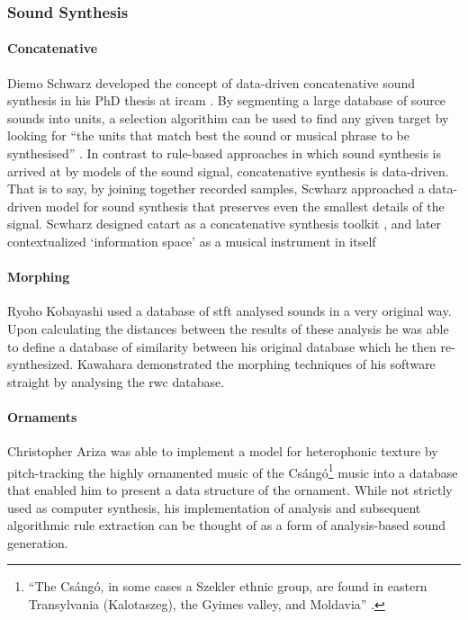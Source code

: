 \subsubsection{Sound Synthesis}
\label{applications:synthesis}

\paragraph{Concatenative}
Diemo Schwarz developed the concept of data-driven concatenative sound synthesis in his PhD thesis at \gls{ircam} \parencite{Schwarz2000, icmc/bbp2372.2003.099, Sch06:How}. By segmenting a large database of source sounds into units, a selection algorithim can be used to find any given target by looking for ``the units that match best the sound or musical phrase to be synthesised'' \parencite{Sch06:How}. In contrast to rule-based approaches in which sound synthesis is arrived at by models of the sound signal, concatenative synthesis is data-driven. That is to say, by joining together recorded samples, Scwharz approached a data-driven model for sound synthesis that preserves even the smallest details of the signal. Scwharz designed \gls{catart} as a concatenative synthesis toolkit \parencite{Sch06:Rea}, and later contextualized `information space' as a musical instrument in itself \parencite{Schwarz:2012}

\paragraph{Morphing}
Ryoho Kobayashi \parencite{icmc/bbp2372.2003.052} used a database of \gls{stft} analysed sounds in a very original way. Upon calculating the distances between the results of these analysis he was able to define a database of similarity between his original database which he then re-synthesized. Kawahara \parencite{Kawahara:2004} demonstrated the morphing techniques of his software \gls{straight} \parencite{icmc/bbp2372.1999.411} by analysing the \gls{rwc} database. 

\paragraph{Ornaments}
Christopher Ariza \parencite{icmc/bbp2372.2003.030} was able to implement a model for heterophonic texture by pitch-tracking the highly ornamented music of the Csángó\footnote{``The Csángó, in some cases a Szekler ethnic group, are found in eastern Transylvania (Kalotaszeg), the Gyimes valley, and Moldavia'' \parencite{icmc/bbp2372.2003.030}.} music into a database that enabled him to present a data structure of the ornament. While not strictly used as computer synthesis, his implementation of analysis and subsequent algorithmic rule extraction can be thought of as a form of analysis-based sound generation.

